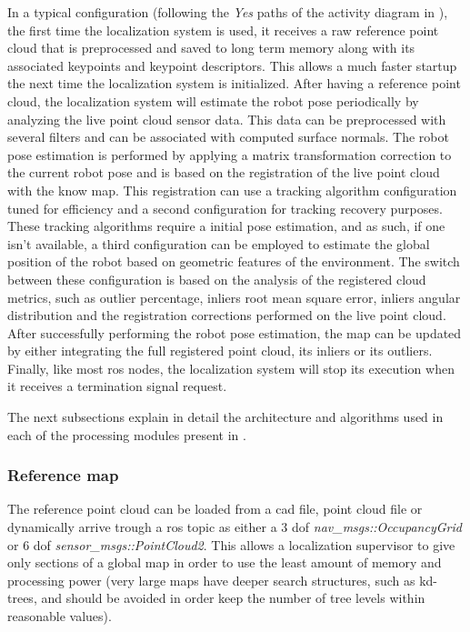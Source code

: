 In a typical configuration (following the \emph{Yes} paths of the activity diagram in ), the first time the localization system is used, it receives a raw reference point cloud that is preprocessed and saved to long term memory along with its associated keypoints and keypoint descriptors. This allows a much faster startup the next time the localization system is initialized. After having a reference point cloud, the localization system will estimate the robot pose periodically by analyzing the live point cloud sensor data. This data can be preprocessed with several filters and can be associated with computed surface normals. The robot pose estimation is performed by applying a matrix transformation correction to the current robot pose and is based on the registration of the live point cloud with the know map. This registration can use a tracking algorithm configuration tuned for efficiency and a second configuration for tracking recovery purposes. These tracking algorithms require a initial pose estimation, and as such, if one isn't available, a third configuration can be employed to estimate the global position of the robot based on geometric features of the environment. The switch between these configuration is based on the analysis of the registered cloud metrics, such as outlier percentage, inliers root mean square error, inliers angular distribution and the registration corrections performed on the live point cloud. After successfully performing the robot pose estimation, the map can be updated by either integrating the full registered point cloud, its inliers or its outliers. Finally, like most \gls{ros} nodes, the localization system will stop its execution when it receives a termination signal request.

The next subsections explain in detail the architecture and algorithms used in each of the processing modules present in .


\subsubsection{Reference map}

The reference point cloud can be loaded from a \gls{cad} file, point cloud file or dynamically arrive trough a \gls{ros} topic as either a 3 \gls{dof} \emph{nav\_msgs::OccupancyGrid} or 6 \gls{dof} \emph{sensor\_msgs::PointCloud2}. This allows a localization supervisor to give only sections of a global map in order to use the least amount of memory and processing power (very large maps have deeper search structures, such as kd-trees, and should be avoided in order keep the number of tree levels within reasonable values).


